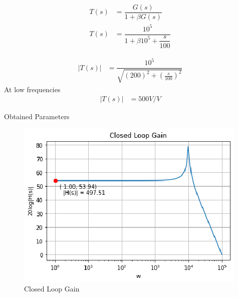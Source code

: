 \begin{enumerate}[label=\arabic*.,ref=\theenumi]
\begin{align}
T(s) &= \dfrac{G(s)}{1+\beta G(s)}
\\
T(s) &= \dfrac{10^{5}}{1+\beta 10^{5}+ \dfrac{s}{100}}
\end{align}

\begin{align}
|T(s)| &= \dfrac{10^{5}}{\sqrt{(200)^{2} + (\frac{s}{100})^{2}}}
\end{align}
At low frequencies
\begin{align}
|T(s)| &= 500 V/V
\end{align}

\begin{table}[!ht]
\centering

\caption{Obtained Parameters}
\label{table:ee18btech11001_params}
\end{table}


\begin{figure}[!ht]
\centering
    \includegraphics[width=\columnwidth]{./figs/ee18btech11001/Figure_2.eps}
  \caption{Closed Loop Gain}
  \label{fig:ee18btech11001_fig2}
\end{figure}


\end{enumerate}

